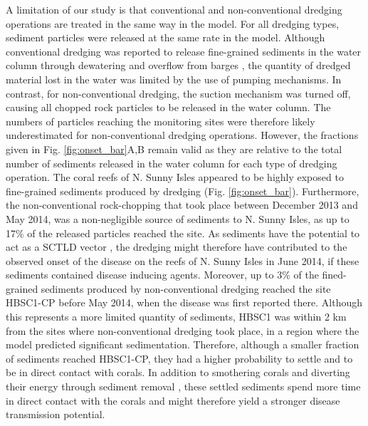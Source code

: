 \documentclass[preprint,12pt,authoryear]{elsarticle}
\begin{document}
A limitation of our study is that conventional and non-conventional dredging operations are treated in the same way in the model. For all dredging types, sediment particles were released at the same rate in the model. Although conventional dredging was reported to release fine-grained sediments in the water column through dewatering and overflow from barges \citep{jones2016assessing}, the quantity of dredged material lost in the water was limited by the use of pumping mechanisms. In contrast, for non-conventional dredging, the suction mechanism was turned off, causing all chopped rock particles to be released in the water column. The numbers of particles reaching the monitoring sites were therefore likely underestimated for non-conventional dredging operations. However, the fractions given in Fig. \ref{fig:onset_bar}A,B remain valid as they are relative to the total number of sediments released in the water column for each type of dredging operation. The coral reefs of N. Sunny Isles appeared to be highly exposed to fine-grained sediments produced by dredging (Fig. \ref{fig:onset_bar}). Furthermore, the non-conventional rock-chopping that took place between December 2013 and May 2014, was a non-negligible source of sediments to N. Sunny Isles, as up to 17\% of the released particles reached the site. As sediments have the potential to act as a SCTLD vector \citep{rosales2020rhodobacterales, studivan2022reef}, the dredging might therefore have contributed to the observed onset of the disease on the reefs of N. Sunny Isles in June 2014, if these sediments contained disease inducing agents. Moreover, up to 3\% of the fined-grained sediments produced by non-conventional dredging reached the site HBSC1-CP before May 2014, when the disease was first reported there. Although this represents a more limited quantity of sediments, HBSC1 was within 2 km from the sites where non-conventional dredging took place, in a region where the model predicted significant sedimentation. Therefore, although a smaller fraction of sediments reached HBSC1-CP, they had a higher probability to settle and to be in direct contact with corals. In addition to smothering corals and diverting their energy through sediment removal \citep{erftemeijer2012environmental}, these settled sediments spend more time in direct contact with the corals and might therefore yield a stronger disease transmission potential.
\end{document}
